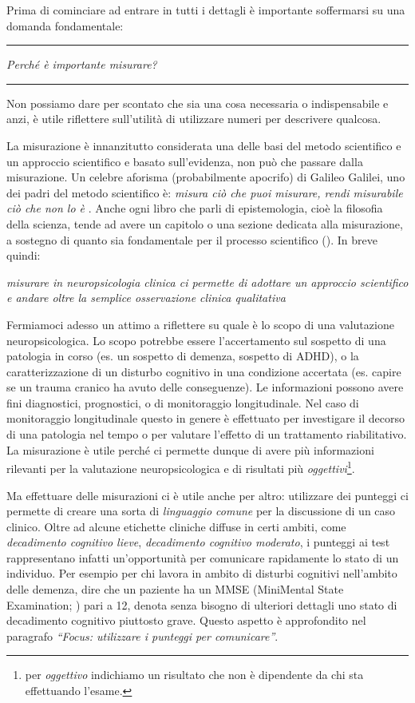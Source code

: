 \documentclass[
  italian,
  letterpaper,
  paper=6in:9in,
  pagesize=pdftex,
  headinclude=on,
  footinclude=on,
  11pt]{scrbook}
\newenvironment{domanda}{%
  \par\medskip\noindent\rule{\linewidth}{0.4pt}\vspace{3pt}%
  \begin{center}\large\itshape
}{%
  \end{center}\vspace{-4pt}\noindent\rule{\linewidth}{0.4pt}\par\medskip
}
\begin{document}
\pagebreak

Prima di cominciare ad entrare in tutti i dettagli è importante
soffermarsi su una domanda fondamentale:

\begin{domanda}

\emph{Perché è importante misurare?}

\end{domanda}

Non possiamo dare per scontato che sia una cosa necessaria o
indispensabile e anzi, è utile riflettere sull'utilità di utilizzare
numeri per descrivere qualcosa.

La misurazione è innanzitutto considerata una delle basi del metodo
scientifico e un approccio scientifico e basato sull'evidenza, non può
che passare dalla misurazione. Un celebre aforisma (probabilmente
apocrifo) di Galileo Galilei, uno dei padri del metodo scientifico è:
\emph{misura ciò che puoi misurare, rendi misurabile ciò che non lo è} .
Anche ogni libro che parli di epistemologia, cioè la filosofia della
scienza, tende ad avere un capitolo o una sezione dedicata alla
misurazione, a sostegno di quanto sia fondamentale per il processo
scientifico (\cite{boniolo1999filosofia}). In breve quindi:

\emph{misurare in neuropsicologia clinica ci permette di adottare un
approccio scientifico e andare oltre la semplice osservazione clinica
qualitativa}

Fermiamoci adesso un attimo a riflettere su quale è lo scopo di una
valutazione neuropsicologica. Lo scopo potrebbe essere l'accertamento
sul sospetto di una patologia in corso (es. un sospetto di demenza,
sospetto di ADHD), o la caratterizzazione di un disturbo cognitivo in
una condizione accertata (es. capire se un trauma cranico ha avuto delle
conseguenze). Le informazioni possono avere fini diagnostici,
prognostici, o di monitoraggio longitudinale. Nel caso di monitoraggio
longitudinale questo in genere è effettuato per investigare il decorso
di una patologia nel tempo o per valutare l'effetto di un trattamento
riabilitativo. La misurazione è utile perché ci permette dunque di avere
più informazioni rilevanti per la valutazione neuropsicologica e di
risultati più \emph{oggettivi}\footnote{per \emph{oggettivo} indichiamo
  un risultato che non è dipendente da chi sta effettuando l'esame.}.

Ma effettuare delle misurazioni ci è utile anche per altro: utilizzare
dei punteggi ci permette di creare una sorta di \emph{linguaggio comune}
per la discussione di un caso clinico. Oltre ad alcune etichette
cliniche diffuse in certi ambiti, come \emph{decadimento cognitivo
lieve}, \emph{decadimento cognitivo moderato}, i punteggi ai test
rappresentano infatti un'opportunità per comunicare rapidamente lo stato
di un individuo. Per esempio per chi lavora in ambito di disturbi
cognitivi nell'ambito delle demenza, dire che un paziente ha un MMSE
(MiniMental State Examination; \cite{folstein1975mini}) pari a 12,
denota senza bisogno di ulteriori dettagli uno stato di decadimento
cognitivo piuttosto grave. Questo aspetto è approfondito nel paragrafo
\emph{``Focus: utilizzare i punteggi per comunicare''}.
\end{document}
